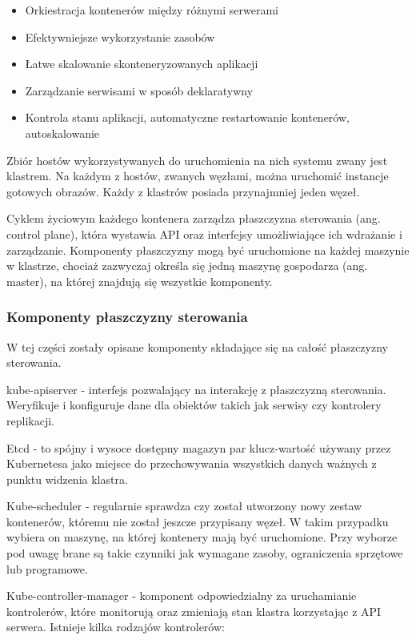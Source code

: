 \documentclass[11pt, a4]{article} %
\begin{document}
\begin{itemize} %
    \item Orkiestracja kontenerów między różnymi serwerami
    \item Efektywniejsze wykorzystanie zasobów
    \item Łatwe skalowanie skonteneryzowanych aplikacji 
    \item Zarządzanie serwisami w sposób deklaratywny
    \item Kontrola stanu aplikacji, automatyczne restartowanie kontenerów, 
    autoskalowanie
\end{itemize}

Zbiór hostów wykorzystywanych do uruchomienia na nich systemu zwany jest klastrem. Na 
każdym z hostów, zwanych węzłami, można uruchomić instancje gotowych obrazów. Każdy 
z klastrów posiada przynajmniej jeden węzeł.

Cyklem życiowym każdego kontenera zarządza płaszczyzna sterowania (ang. control 
plane), która wystawia API oraz interfejsy umożliwiające ich wdrażanie i zarządzanie. 
Komponenty płaszczyzny mogą być uruchomione na każdej maszynie w klastrze, chociaż 
zazwyczaj określa się jedną maszynę gospodarza (ang. master), na której znajdują się 
wszystkie komponenty.

\subsubsection{Komponenty płaszczyzny sterowania}

W tej części zostały opisane komponenty składające się na całość płaszczyzny 
sterowania.

kube-apiserver - interfejs pozwalający na interakcję z płaszczyzną sterowania. 
Weryfikuje i konfiguruje dane dla obiektów takich jak serwisy czy kontrolery 
replikacji. 

Etcd - to spójny i wysoce dostępny magazyn par klucz-wartość używany przez Kubernetesa 
jako miejsce do przechowywania wszystkich danych ważnych z punktu widzenia klastra. 

Kube-scheduler - regularnie sprawdza czy został utworzony nowy zestaw 
kontenerów, któremu nie został jeszcze przypisany węzeł. W takim przypadku wybiera 
on maszynę, na której kontenery mają być uruchomione. Przy wyborze pod uwagę brane są 
takie czynniki jak wymagane zasoby, ograniczenia sprzętowe lub programowe.

Kube-controller-manager - komponent odpowiedzialny za uruchamianie kontrolerów, które 
monitorują oraz zmieniają stan klastra korzystając z API serwera. Istnieje kilka 
rodzajów kontrolerów:
\end{document}
